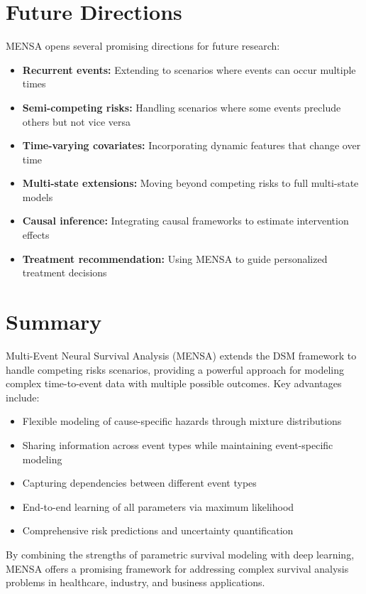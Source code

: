 \section{Future Directions}

MENSA opens several promising directions for future research:

\begin{itemize}
    \item \textbf{Recurrent events:} Extending to scenarios where events can occur multiple times
    \item \textbf{Semi-competing risks:} Handling scenarios where some events preclude others but not vice versa
    \item \textbf{Time-varying covariates:} Incorporating dynamic features that change over time
    \item \textbf{Multi-state extensions:} Moving beyond competing risks to full multi-state models
    \item \textbf{Causal inference:} Integrating causal frameworks to estimate intervention effects
    \item \textbf{Treatment recommendation:} Using MENSA to guide personalized treatment decisions
\end{itemize}

\section{Summary}

Multi-Event Neural Survival Analysis (MENSA) extends the DSM framework to handle competing risks scenarios, providing a powerful approach for modeling complex time-to-event data with multiple possible outcomes. Key advantages include:

\begin{itemize}
    \item Flexible modeling of cause-specific hazards through mixture distributions
    \item Sharing information across event types while maintaining event-specific modeling
    \item Capturing dependencies between different event types
    \item End-to-end learning of all parameters via maximum likelihood
    \item Comprehensive risk predictions and uncertainty quantification
\end{itemize}

By combining the strengths of parametric survival modeling with deep learning, MENSA offers a promising framework for addressing complex survival analysis problems in healthcare, industry, and business applications.
